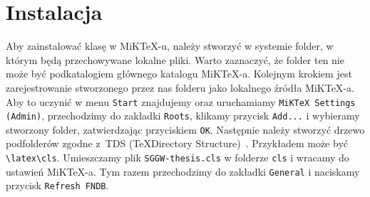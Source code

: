\documentclass{SGGW-thesis}
\begin{document}
\section{Instalacja}
Aby zainstalować klasę w MiK\TeX-u, należy stworzyć w systemie folder, w którym będą przechowywane lokalne pliki. Warto zaznaczyć, że folder ten nie może być podkatalogiem
głównego katalogu MiK\TeX-a. Kolejnym krokiem jest zarejestrowanie stworzonego przez nas folderu jako lokalnego źródła MiK\TeX-a. Aby to uczynić w menu \verb|Start|
znajdujemy oraz uruchamiamy \verb|MiKTeX Settings (Admin)|, przechodzimy do zakładki \verb|Roots|, klikamy przycisk \verb|Add...| i wybieramy stworzony folder, zatwierdzając
przyciskiem \verb|OK|. Następnie należy stworzyć drzewo podfolderów zgodne z~TDS (\TeX Directory Structure)~\cite{tds}. Przykładem może być \verb|\latex\cls|. Umieszczamy
plik \verb|SGGW-thesis.cls| w folderze \verb|cls| i wracamy do ustawień MiK\TeX-a. Tym razem przechodzimy do zakładki \verb|General| i naciskamy przycisk \verb|Refresh FNDB|.
\end{document}
